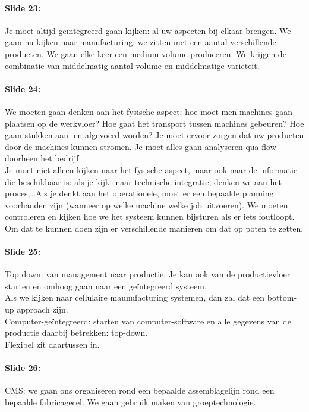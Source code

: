 \documentclass[10pt,a4paper]{report}
\begin{document}
\paragraph{Slide 23:} Je moet altijd ge\"integreerd gaan kijken: al uw aspecten bij elkaar brengen. We gaan nu kijken naar manufacturing: we zitten met een aantal verschillende producten. We gaan elke keer een medium volume produceren. We krijgen de combinatie van middelmatig aantal volume en middelmatige vari\"eteit.

\paragraph{Slide 24:} We moeten gaan denken aan het fysische aspect: hoe moet men machines gaan plaatsen op de werkvloer? Hoe gaat het transport tussen machines gebeuren? Hoe gaan stukken aan- en afgevoerd worden? Je moet ervoor zorgen dat uw producten door de machines kunnen stromen. Je moet alles gaan analyseren qua flow doorheen het bedrijf.\\
Je moet niet alleen kijken naar het fysische aspect, maar ook naar de informatie die beschikbaar is: als je kijkt naar technische integratie, denken we aan het proces,\ldots Als je denkt aan het operationele, moet er een bepaalde planning voorhanden zijn (wanneer op welke machine welke job uitvoeren). We moeten controleren en kijken hoe we het systeem kunnen bijsturen als er iets foutloopt.\\
Om dat te kunnen doen zijn er verschillende manieren om dat op poten te zetten.

\paragraph{Slide 25:} Top down: van management naar productie. Je kan ook van de productievloer starten en omhoog gaan naar een ge\"integreerd systeem.\\
Als we kijken naar cellulaire maunufacturing systemen, dan zal dat een bottom-up approach zijn.\\
Computer-ge\"integreerd: starten van computer-software en alle gegevens van de productie daarbij betrekken: top-down.\\
Flexibel zit daartussen in.

\paragraph{Slide 26:} CMS: we gaan ons organiseren rond een bepaalde assemblagelijn rond een bepaalde fabricagecel. We gaan gebruik maken van groeptechnologie. 
\end{document}
